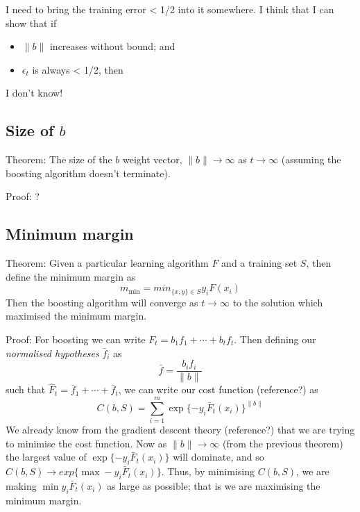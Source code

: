 I need to bring the training error < 1/2 into it somewhere.  I think
that I can show that if
\begin{itemize}
\item	$\|b\|$ increases without bound; and
\item	$\epsilon_t$ is always < 1/2, then
\end{itemize}
I don't know!




\subsection{Size of $b$}
Theorem: The size of the $b$ weight vector, $\|b\| \rightarrow \infty$
as $t \rightarrow \infty$ (assuming the boosting algorithm doesn't
terminate).

Proof: ?


\subsection{Minimum margin}
Theorem: Given a particular learning algorithm $F$ and a training
set $S$, then define the minimum margin as
\[
m_{\min} = min_{\{x,y\} \in S} y_i F(x_i)
\]
Then the boosting algorithm will converge as $t \rightarrow \infty$ to
the solution which maximised the minimum margin.

Proof: For boosting we can write $F_t = b_1 f_1 + \cdots + b_t f_t$.
Then defining our \emph{normalised hypotheses} $\bar{f}_i$ as
\[
\bar{f} = \frac{b_i f_i}{\|b\|}
\]
such that $\hat{F}_t = \bar{f}_1 + \cdots + \bar{f}_t$, we can write
our cost function (reference?) as 
\[
C(b, S) = \sum_{i=1}^{m} \exp\{-y_i \bar{F}_t(x_i)\}^{\|b\|}
\]
We already know from the gradient descent theory (reference?) that we
are trying to minimise the cost function.  Now as $\|b\| \rightarrow
\infty$ (from the previous theorem) the largest value of $\exp\{-y_i
\bar{F}_t(x_i)\}$ will dominate, and so $C(b, S) \rightarrow exp\{\max
-y_i \bar{F}_t(x_i)\}$.  Thus, by minimising $C(b, S)$, we are making
$\min y_i \bar{F}_t(x_i)$ as large as possible; that is we are
maximising the minimum margin.
